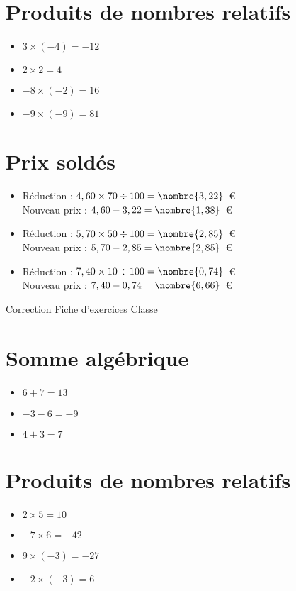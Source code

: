 \documentclass[a4paper,11pt,fleqn]{article}
\begin{document}
\section{Produits de nombres relatifs}
\begin{itemize}

  \item $3\times(-4)=-12$
  \item $2\times2=4$
  \item $-8\times(-2)=16$
  \item $-9\times(-9)=81$
\end{itemize}

\section{Prix soldés}
\begin{itemize}

  \item Réduction : $4,60\times70\div100=\nombre{3,22}$~€\\
  Nouveau prix : $4,60-3,22=\nombre{1,38}$~€
  \item Réduction : $5,70\times50\div100=\nombre{2,85}$~€\\
  Nouveau prix : $5,70-2,85=\nombre{2,85}$~€
  \item Réduction : $7,40\times10\div100=\nombre{0,74}$~€\\
  Nouveau prix : $7,40-0,74=\nombre{6,66}$~€
\end{itemize}
\newpage
\setcounter{exo}{0}
\setcounter{section}{0}
{Correction} \hfill {\huge Fiche d'exercices } \hfill {Classe}

\section{Somme algébrique}
\begin{itemize}

  \item $6 +7=13$
  \item $-3 -6=-9$
  \item $4 +3=7$
\end{itemize}

\section{Produits de nombres relatifs}
\begin{itemize}

  \item $2\times5=10$
  \item $-7\times6=-42$
  \item $9\times(-3)=-27$
  \item $-2\times(-3)=6$
\end{itemize}
\end{document}
